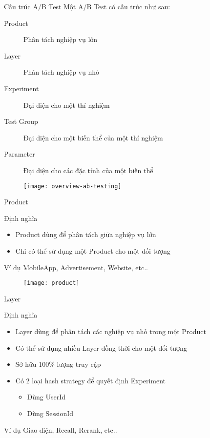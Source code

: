 \begin{frame}{Cấu trúc A/B Test}
	Một \alert{A/B Test} có cấu trúc như sau:
	\begin{description}
		\item[Product] Phân tách nghiệp vụ lớn
		\item[Layer] Phân tách nghiệp vụ nhỏ
		\item[Experiment] Đại diện cho một thí nghiệm
		\item[Test Group] Đại diện cho một biến thể của một thí nghiệm
		\item[Parameter] Đại diện cho các đặc tính của một biến thể
	\end{description}
	\begin{figure}
		\texttt{[image: overview-ab-testing]}
	\end{figure}
\end{frame}

\begin{frame}{Product}
	\begin{block}{Định nghĩa}
		\begin{itemize}
			\item Product dùng để phân tách giữa nghiệp vụ lớn
			\item Chỉ có thể sử dụng một Product cho một đối tượng
		\end{itemize}
	\end{block}
	\begin{block}{Ví dụ}
		MobileApp, Advertisement, Website, etc..
	\end{block}
	\begin{figure}
		\texttt{[image: product]}
	\end{figure}
\end{frame}

\begin{frame}{Layer}
	\begin{block}{Định nghĩa}
		\begin{itemize}
			\item Layer dùng để phân tách các nghiệp vụ nhỏ trong một Product
			\item Có thể sử dụng nhiều Layer đồng thời cho một đối tượng
			\item Sở hữu 100\% lượng truy cập
			\item Có 2 loại hash strategy để quyết định Experiment
			      \begin{itemize}
				      \item Dùng UserId
				      \item Dùng SessionId
			      \end{itemize}
		\end{itemize}
	\end{block}
	\begin{block}{Ví dụ}
		Giao diện, Recall, Rerank, etc..
	\end{block}
\end{frame}

